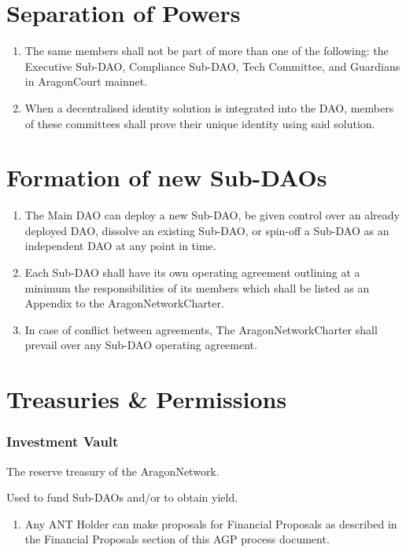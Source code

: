\section{Separation of Powers}

\begin{enumerate}
	\item The same members shall not be part of more than one of the following: the Executive Sub-\ac{DAO}, Compliance Sub-\ac{DAO}, Tech Committee, and \glspl{Guardian} in \gls{AragonCourt} mainnet.
	\item When a decentralised identity solution is integrated into the \ac{DAO}, members of these committees shall prove their unique identity using said solution.
\end{enumerate}


\section{Formation of new Sub-DAOs}

\begin{enumerate}
	\item The Main \ac{DAO} can deploy a new Sub-\ac{DAO}, be given control over an already deployed \ac{DAO}, dissolve an existing Sub-\ac{DAO}, or spin-off a Sub-\ac{DAO} as an independent \ac{DAO} at any point in time.
	\item Each Sub-\ac{DAO} shall have its own operating agreement outlining at a minimum the responsibilities of its members which shall be listed as an Appendix to the \gls{AragonNetworkCharter}.
	\item In case of conflict between agreements, The \gls{AragonNetworkCharter} shall prevail over any Sub-\ac{DAO} operating agreement.
\end{enumerate}


\section{Treasuries \& Permissions}

\subsubsection*{Investment Vault} The reserve treasury of the \gls{AragonNetwork}.

Used to fund Sub-\acp{DAO} and/or to obtain yield.
\begin{enumerate}
	\item Any \ac{ANT} Holder can make proposals for Financial Proposals as described in the Financial Proposals section of this \ac{AGP} process document.
\end{enumerate}


